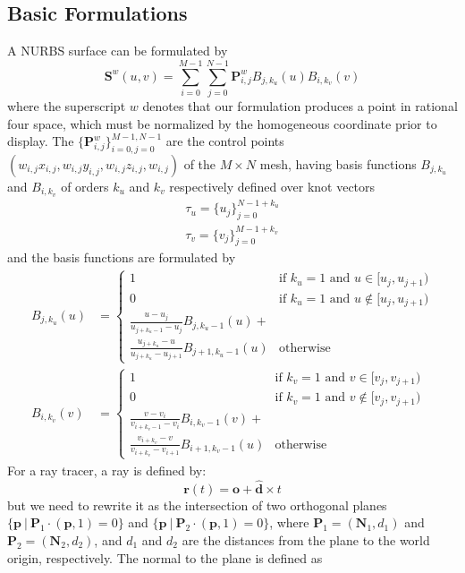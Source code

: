 \documentclass[acmtog]{acmart}
\begin{document}
\subsection{Basic Formulations}
\hspace*{8pt}
A NURBS surface can be formulated by
\[
    \mathbf{S}^w(u,v)=\sum_{i=0}^{M-1}\sum_{j=0}^{N-1}\mathbf{P}^w_{i,j}B_{j,k_u}(u)B_{i,k_v}(v)
\]
where the superscript $w$ denotes that our formulation produces a point in rational four space, which must be normalized by the homogeneous coordinate prior to display. The $\{\mathbf{P}_{i,j}^w\}_{i=0,j=0}^{M-1,N-1}$ are the control points $(w_{i,j}x_{i,j},w_{i,j}y_{i,j},w_{i,j}z_{i,j},w_{i,j})$ of the $M\times N$ mesh, having basis functions $B_{j,k_u}$ and $B_{i,k_v}$ of orders $k_u$ and $k_v$ respectively defined over knot vectors
\[
    \begin{split}
        \tau_u=\{u_j\}_{j=0}^{N-1+k_u}\\
        \tau_v=\{v_j\}_{j=0}^{M-1+k_v}
    \end{split}    
\]
and the basis functions are formulated by
\[
    \begin{split}
        B_{j,k_u}(u)&=\begin{cases}
            1&\text{if }k_u=1\text{ and }u\in[u_j,u_{j+1})\\
            0&\text{if }k_u=1\text{ and }u\notin[u_j,u_{j+1})\\
            \frac{u-u_j}{u_{j+k_u-1}-u_j}B_{j,k_u-1}(u)+\\
            \frac{u_{j+k_u}-u}{u_{j+k_u}-u_{j+1}}B_{j+1,k_u-1}(u)&\text{otherwise}
        \end{cases}\\
        B_{i,k_v}(v)&=\begin{cases}
            1&\text{if }k_v=1\text{ and }v\in[v_j,v_{j+1})\\
            0&\text{if }k_v=1\text{ and }v\notin[v_j,v_{j+1})\\
            \frac{v-v_i}{v_{i+k_v-1}-v_i}B_{i,k_v-1}(v)+\\
            \frac{v_{i+k_v}-v}{v_{i+k_v}-v_{i+1}}B_{i+1,k_v-1}(u)&\text{otherwise}
        \end{cases}
    \end{split}
\]
For a ray tracer, a ray is defined by:
\[
    \mathbf{r}(t)=\mathbf{o}+\hat{\mathbf{d}}\times t
\]
but we need to rewrite it as the intersection of two orthogonal planes $\{\mathbf{p}\ |\ \mathbf{P}_1\cdot(\mathbf{p},1)=0\}$ and $\{\mathbf{p}\ |\ \mathbf{P}_2\cdot(\mathbf{p},1)=0\}$, where $\mathbf{P}_1=(\mathbf{N}_1,d_1)$ and $\mathbf{P}_2=(\mathbf{N}_2,d_2)$, and $d_1$ and $d_2$ are the distances from the plane to the world origin, respectively. The normal to the plane is defined as
\end{document}
